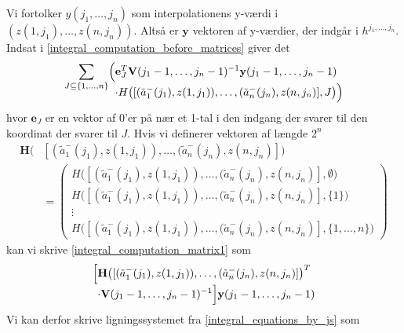 \documentclass[a4paper, 12pt]{memoir}
\begin{document}
Vi fortolker $y(j_1, \dots, j_n)$ som interpolationens y-værdi i $(z(1,j_1), \dots, z(n,j_n))$. Altså er $\mathbf {y}$ vektoren af y-værdier, der indgår i $h^{j_1, \dots, j_n}$. Indsat i \eqref{integral_computation_before_matrices} giver det
\begin{equation}
\sum_{J\subseteq\{1, \dots, n\}}\Bigl( \begin{lgathered}[t]\mathbf{e}_J^T \mathbf{V}(j_1-1, \dots, j_n-1)^{-1} \mathbf{y}(j_1-1, \dots, j_n-1)\\
\cdot H\bigl([(\tilde a_1^-(j_1), z(1,j_1)), \dots, (\tilde a_n^-(j_n), z(n,j_n)], J\bigr)\Bigr)\end{lgathered}\label{integral_computation_matrix1}
\end{equation}
hvor $\mathbf{e}_J$ er en vektor af 0'er på nær et 1-tal i den indgang der svarer til den koordinat der svarer til $J$. Hvis vi definerer vektoren af længde $2^n$ 
\begin{align}
\mathbf{H}\bigl(&[(\tilde a_1^-(j_1), z(1,j_1)), \dots, (\tilde a_n^-(j_n), z(n,j_n)]\bigr)\\
&=\begin{pmatrix}
H\bigl([(\tilde a_1^-(j_1), z(1,j_1)), \dots, (\tilde a_n^-(j_n), z(n,j_n)], \emptyset \bigr)\\
H\bigl([(\tilde a_1^-(j_1), z(1,j_1)), \dots, (\tilde a_n^-(j_n), z(n,j_n)], \{1\} \bigr)\\
\vdots \\
H\bigl([(\tilde a_1^-(j_1), z(1,j_1)), \dots, (\tilde a_n^-(j_n), z(n,j_n)], \{1, \dots, n\} \bigr)
\end{pmatrix}
\end{align}
kan vi skrive \eqref{integral_computation_matrix1} som
\begin{equation}
\Bigl[\begin{lgathered}[t] \mathbf{H}\bigl([(\tilde a_1^-(j_1), z(1,j_1)), \dots, (\tilde a_n^-(j_n), z(n,j_n)]\bigr)^T\\
\cdot \mathbf{V}(j_1-1, \dots, j_n-1)^{-1} \Bigr] \mathbf{y}(j_1-1, \dots, j_n-1) \end{lgathered}\label{integral_computation_matrix2}
\end{equation}
Vi kan derfor skrive ligningssystemet fra \eqref{integral_equations_by_js} som
\end{document}
